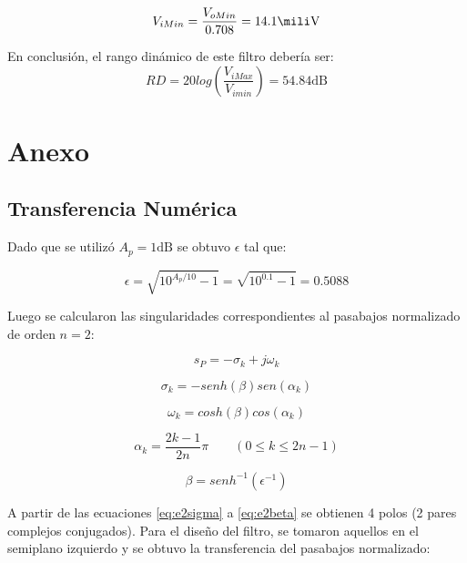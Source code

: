{\begin{equation}
V_{iMin} = \frac{V_{oMin}}{0.708} = 14.1 \si{\mili\volt}
\end{equation}

En conclusión, el rango dinámico de este filtro debería ser:
\begin{equation}
RD = 20 log\left(\frac{V_{i Max}}{V_{i min}} \right)= 54.84 \si{\deci\bel}
\end{equation}

\newpage

\section{Anexo}

\subsection{Transferencia Numérica}

Dado que se utilizó $A_p=1 \si{\deci\bel}$ se obtuvo $\epsilon$ tal que:

\begin{equation}
\epsilon=\sqrt{10^{A_p/10}-1}=\sqrt{10^{0.1}-1} = 0.5088
\end{equation}

Luego se calcularon las singularidades correspondientes al pasabajos normalizado de orden $n=2$:

\begin{equation}
s_P= -\sigma _k  + j \omega _k
\label{eq:e2sing}
\end{equation}

\begin{equation}
\sigma _k=-senh( \beta ) sen(\alpha _k)
\label{eq:e2sigma}
\end{equation}

\begin{equation}
\omega _k=cosh( \beta) cos(\alpha _k)
\label{eq:e2omega}
\end{equation}

\begin{equation}
\alpha_k=\frac{2k-1}{2n}\pi \qquad (0 \leq k \leq 2n-1)
\label{eq:e2alphak}
\end{equation}

\begin{equation}
\beta=senh^{-1}\left( \epsilon^{-1}\right) 
\label{eq:e2beta}
\end{equation}

A partir de las ecuaciones \eqref{eq:e2sigma} a \eqref{eq:e2beta} se obtienen 4 polos (2 pares complejos conjugados). Para el diseño del filtro, se tomaron aquellos en el semiplano izquierdo y se obtuvo la transferencia del pasabajos normalizado:

}
